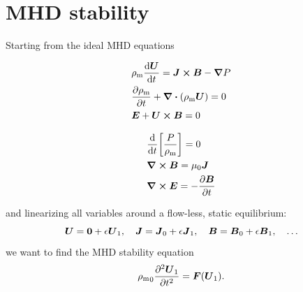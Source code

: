 \documentclass[11pt,a4paper, 
swedish, english %
]{article}
\newcommand{\rhom}{\ensuremath{{\rho_{\text{m}}}}}
\begin{document}
\section{MHD stability}
Starting from the ideal MHD equations
\vspace{-22pt}
\begin{multicols}{2}
\begin{subequations}
\begin{align}
\label{eq:MHD-a}
&\rhom\dv{\vb*U}{t}=\vb*J\cross\vb*B-\grad P
\\ \label{eq:MHD-b}
&\pdv{\rhom}{t} +\div(\rhom\vb*U)=0
\\ \label{eq:MHD-c}
&\vb*E+\vb*U\cross\vb*B=0
\end{align}
\end{subequations}

\columnbreak

\addtocounter{equation}{-1}
\begin{subequations}
\addtocounter{equation}{3}
\begin{align}
\label{eq:MHD-d}
&\dv{t}\qty[\frac{P}{\rhom}]=0
\\ \label{eq:MHD-e}
&\curl\vb*B=\mu_0\vb*J %
\\ \label{eq:MHD-f}
&\curl\vb*E=-\pdv{\vb*B}{t}
\end{align}
\end{subequations}
\end{multicols}\noindent
and linearizing all variables around a flow-less, static equilibrium:
\begin{equation}
\vb*U=\vb0+\epsilon\vb*U_1 \qc
\vb*J=\vb*J_0+\epsilon\vb*J_1 \qc
\vb*B=\vb*B_0+\epsilon\vb*B_1 \qc
\ldots
\end{equation}
we want to find the MHD stability equation
\begin{equation}
\rhom_0\pdv[2]{\vb*U_1}{t}=\vb*F(\vb*U_1).
\end{equation}
\end{document}
